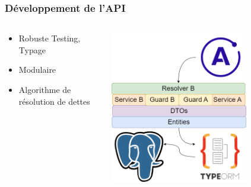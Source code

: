 \documentclass[aspectratio=169]{beamer}
\begin{document}
    \begin{frame}
        \frametitle{Développement de l'API}
        \begin{columns}
            \begin{column}{0.5\textwidth}
                \begin{itemize}
                    \item Robuste Testing, Typage
                    \item Modulaire
                    \item Algorithme de résolution de dettes
                \end{itemize}
            \end{column}

            \begin{column}{0.5\textwidth}
                \begin{flushleft}
                    \includegraphics[width=0.7\textwidth]{imgs/module}\label{fig:figure4}
                \end{flushleft}
            \end{column}
        \end{columns}

    \end{frame}
\end{document}
